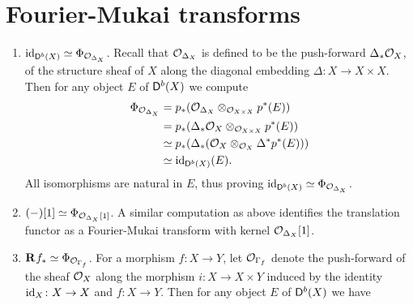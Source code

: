 \section{Fourier-Mukai transforms}

\begin{example}
    \label{Identifying fm transforms}
\begin{enumerate}[label = (\roman*)]
    \item{
    $\operatorname{id}_{\mathsf{D}^b(X)} \simeq \Phi_{\mathcal{O}_{\Delta_X}}$. Recall that $\mathcal{O}_{\Delta_X}$ is defined to be the push-forward $\Delta_*\mathcal{O}_{X}$, of the structure sheaf of $X$ along the diagonal embedding $\Delta \colon X \to X \times X$. Then for any object $E$ of $\mathsf{D}^b(X)$ we compute 
    \begin{align*}
        \Phi_{\mathcal{O}_{\Delta_X}} &= p_*(\mathcal{O}_{\Delta_X} \otimes_{\mathcal{O}_{X \times X}} p^*(E)) \\
        &= p_*(\Delta_*\mathcal{O}_{X} \otimes_{\mathcal{O}_{X \times X}} p^*(E)) \\
        &\simeq p_*(\Delta_*(\mathcal{O}_{X} \otimes_{\mathcal{O}_{X}} \Delta^*p^*(E))) \\
        &\simeq \operatorname{id}_{\mathsf{D}^b(X)}(E).
    \end{align*}
    All isomorphisms are natural in $E$, thus proving $\operatorname{id}_{\mathsf{D}^b(X)} \simeq \Phi_{\mathcal{O}_{\Delta_X}}$.
    }
    \item{$(-)[1] \simeq \Phi_{\mathcal{O}_{\Delta_X}[1]}$. A similar computation as above identifies the translation functor as a Fourier-Mukai transform with kernel $\mathcal{O}_{\Delta_X}[1]$.}
    \item{$\mathbf{R}^{}f_* \simeq \Phi_{\mathcal{O}_{\Gamma_f}}$. For a morphism $f \colon X \to Y$, let $\mathcal{O}_{\Gamma_f}$ denote the push-forward of the sheaf $\mathcal{O}_{X}$ along the morphism $i\colon X \to X \times Y$ induced by the identity $\operatorname{id}_{X}\colon X \to X$ and $f\colon X \to Y$.  Then for any object $E$ of $\mathsf{D}^b(X)$ we have
}
\end{enumerate}
\end{example}
